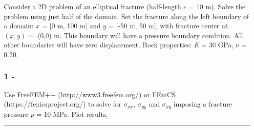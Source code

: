 \documentclass[8pt]{extarticle}
\begin{document}
Consider a 2D problem of an elliptical fracture (half-length \(c\) = 10
m). Solve the problem using just half of the domain. Set the fracture
along the left boundary of a domain: \(x\) = {[}0 m, 100 m{]} and \(y\)
= {[}-50 m, 50 m{]}, with fracture center at \((x,y)=\) (0,0) m. This
boundary will have a pressure boundary condition. All other boundaries
will have zero displacement. Rock properties: \(E\) = 30 GPa, \(\nu\) =
0.20.

\hypertarget{section*}{%
\subsubsection*{1 -}\label{section}}

Use FreeFEM++ (http://www3.freefem.org/) or FEniCS
(https://fenicsproject.org/) to solve for \(\sigma_{xx}\),
\(\sigma_{yy}\) and \(\sigma_{xy}\) imposing a fracture pressure \(p\) =
10 MPa. Plot results.

\begin{center}\rule{0.5\linewidth}{0.5pt}\end{center}
\end{document}
